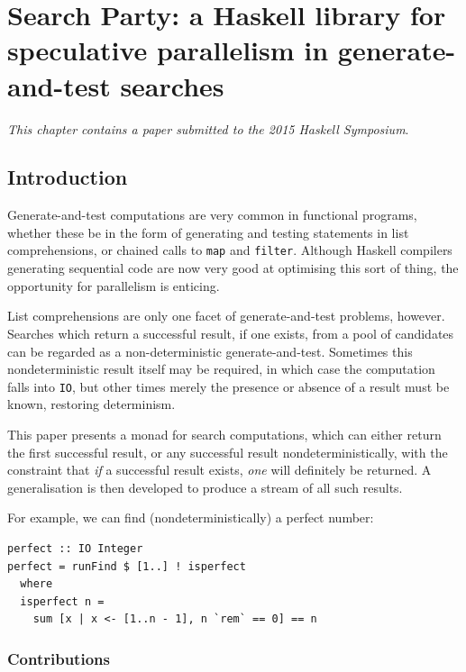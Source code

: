 \chapter{Search Party: a Haskell library for speculative parallelism in
  generate-and-test searches}
\label{chp:searchparty}

\textit{This chapter contains a paper submitted to the 2015 Haskell
  Symposium}\cite{searchparty}.

\section{Introduction}
\label{sec:searchparty-intro}

Generate-and-test computations are very common in functional programs,
whether these be in the form of generating and testing statements in
list comprehensions, or chained calls to \verb|map| and
\verb|filter|. Although Haskell compilers generating sequential code
are now very good at optimising this sort of thing, the opportunity
for parallelism is enticing.

List comprehensions are only one facet of generate-and-test problems,
however. Searches which return a successful result, if one exists,
from a pool of candidates can be regarded as a non-deterministic
generate-and-test. Sometimes this nondeterministic result itself may
be required, in which case the computation falls into \verb|IO|, but
other times merely the presence or absence of a result must be known,
restoring determinism.

This paper presents a monad for search computations, which can either
return the first successful result, or any successful result
nondeterministically, with the constraint that \textit{if} a
successful result exists, \textit{one} will definitely be returned. A
generalisation is then developed to produce a stream of all such
results.

For example, we can find (nondeterministically) a perfect number:

\begin{verbatim}
perfect :: IO Integer
perfect = runFind $ [1..] ! isperfect
  where
  isperfect n =
    sum [x | x <- [1..n - 1], n `rem` == 0] == n
\end{verbatim}

\subsection*{Contributions}

